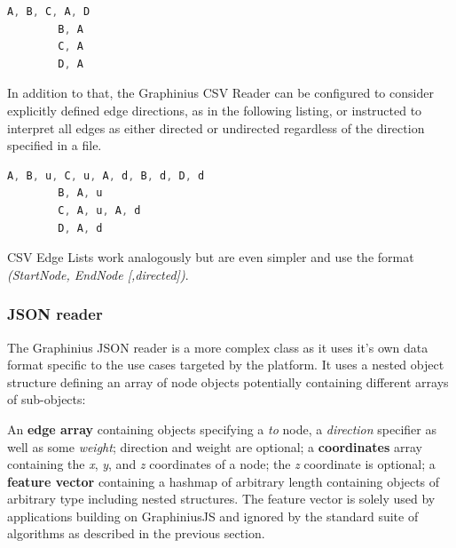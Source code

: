		\begin{lstlisting}[caption={Sample Adjacency list, no edge direction.}, label={lst:adj_list_nodir}, language=JavaScript]
		A, B, C, A, D
		B, A
		C, A
		D, A
		\end{lstlisting}
		
		In addition to that, the Graphinius CSV Reader can be configured to consider explicitly defined edge directions, as in the following listing, or instructed to interpret all edges as either directed or undirected regardless of the direction specified in a file.
		
		\begin{lstlisting}[caption={Sample Adjacency list including edge direction.}, label={lst:adj_list_dir}, language=JavaScript]
		A, B, u, C, u, A, d, B, d, D, d
		B, A, u
		C, A, u, A, d
		D, A, d
		\end{lstlisting}
		
		CSV Edge Lists work analogously but are even simpler and use the format \textit{(StartNode, EndNode [,directed])}.	
		
		
		\subsubsection{JSON reader}
		\label{sssection: io_json}
		
		The Graphinius JSON reader is a more complex class as it uses it's own data format specific to the use cases targeted by the platform. It uses a nested object structure defining an array of node objects potentially containing different arrays of sub-objects:
		
		An \textbf{edge array} containing objects specifying a \textit{to} node, a \textit{direction} specifier as well as some \textit{weight}; direction and weight are optional; a \textbf{coordinates} array containing the \textit{x}, \textit{y}, and \textit{z} coordinates of a node; the \textit{z} coordinate is optional; a \textbf{feature vector} containing a hashmap of arbitrary length containing objects of arbitrary type including nested structures. The feature vector is solely used by applications building on GraphiniusJS and ignored by the standard suite of algorithms as described in the previous section.
		
